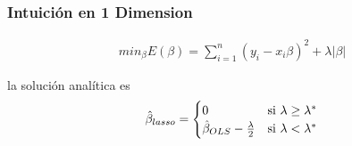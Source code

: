 \documentclass[
  shownotes,
  xcolor={svgnames},
  hyperref={colorlinks,citecolor=DarkBlue,linkcolor=DarkRed,urlcolor=DarkBlue}
  , aspectratio=169]{beamer}
\begin{document}
\begin{frame}[fragile]
\frametitle{Intuición en 1 Dimension}

\begin{align}
min_{\beta} E(\beta) = \sum_{i=1}^n (y_i-x_i \beta)^2 + \lambda|\beta| 
\end{align}

la solución analítica es 
\medskip
\begin{align}
\hat{\beta}_{lasso}=\begin{cases}
0 & \text{\text{si} }\ensuremath{\lambda\geq \lambda^*}\\
\hat{\beta}_{OLS}-\frac{\lambda}{2} & \text{\text{si} }\ensuremath{\lambda<\lambda^*}
\end{cases}
\end{align}



 \end{frame}
\end{document}
